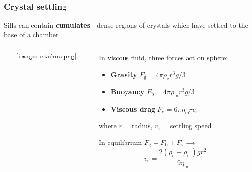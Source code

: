 \documentclass{beamer}
\begin{document}
\begin{frame}
  \frametitle{Crystal settling}

  Sills can contain \textbf{cumulates} - dense regions of crystals which have settled to the base of a chamber
  \begin{columns}[t]

    \begin{column}{0.5\textwidth}

      $$\texttt{[image: stokes.png]}$$

    \end{column}

    \begin{column}{0.5\textwidth}

      In viscous fluid, three forces act on sphere:

      \begin{itemize}
      \item \textbf{Gravity} $F_{\text{g}} = 4 \pi \rho_{\text{c}} r^{3} g / 3$ \\
      \item \textbf{Buoyancy} $F_{\text{b}} = 4 \pi \rho_{\text{m}} r^{3} g / 3$ \\
      \item \textbf{Viscous drag} $F_{\text{v}} = 6 \pi \eta_{\text{m}} r v_{\text{s}}$ \\
      \end{itemize}

      where $r$ = radius, $v_{\text{s}}$ = settling speed \\

      \vspace{0.5cm}
      
      In equilibrium $F_{\text{g}} = F_{\text{b}} + F_{\text{v}} \implies$ \\

      $$ v_{\text{s}} = \frac{2 (\rho_{\text{c}} - \rho_{\text{m}}) g r^{2}}{9 \eta_{\text{m}}} $$
    \end{column}
  \end{columns}
  
\end{frame}
\end{document}
